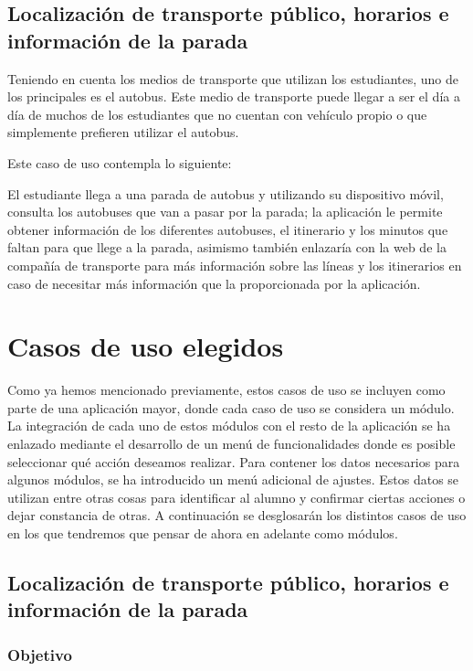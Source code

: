 \subsection{Localización de transporte público, horarios e información de la parada}

Teniendo en cuenta los medios de transporte que utilizan los estudiantes, uno de los principales es el autobus. Este medio de transporte puede llegar a ser el día a día de muchos de los estudiantes que no cuentan con vehículo propio o que simplemente prefieren utilizar el autobus. 

Este caso de uso contempla lo siguiente: 

El estudiante llega a una parada de autobus y utilizando su dispositivo móvil, consulta los autobuses que van a pasar por la parada; la aplicación le permite obtener información de los diferentes autobuses, el itinerario y los minutos que faltan para que llege a la parada, asimismo también enlazaría con la web de la compañía de transporte para más información sobre las líneas y los itinerarios en caso de necesitar más información que la proporcionada por la aplicación.

\section{Casos de uso elegidos}

Como ya hemos mencionado previamente, estos casos de uso se incluyen como parte de una aplicación mayor, donde cada caso de uso se considera un módulo. La integración de cada uno de estos módulos con el resto de la aplicación se ha enlazado mediante el desarrollo de un menú de funcionalidades donde es posible seleccionar qué acción deseamos realizar. Para contener los datos necesarios para algunos módulos, se ha introducido un menú adicional de ajustes. Estos datos se utilizan entre otras cosas para identificar al alumno y confirmar ciertas acciones o dejar constancia de otras. A continuación se desglosarán los distintos casos de uso en los que tendremos que pensar de ahora en adelante como módulos.

\subsection{Localización de transporte público, horarios e información de la parada}

\subsubsection{Objetivo}


